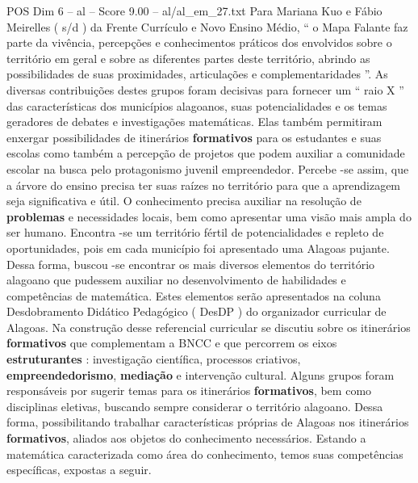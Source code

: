 \begin{textsample}{POS Dim 6 – al – Score 9.00 – al/al\_em\_27.txt}
Para Mariana Kuo e Fábio Meirelles ( s/d ) da Frente Currículo e Novo Ensino Médio, “ o Mapa Falante faz parte da vivência, percepções e conhecimentos práticos dos envolvidos sobre o território em geral e sobre as diferentes partes deste território, abrindo as possibilidades de suas proximidades, articulações e complementaridades ”.
As diversas contribuições destes grupos foram decisivas para fornecer um “ raio X ” das características dos municípios alagoanos, suas potencialidades e os temas geradores de debates e investigações matemáticas.
Elas também permitiram enxergar possibilidades de itinerários \textbf{formativos} para os estudantes e suas escolas como também a percepção de projetos que podem auxiliar a comunidade escolar na busca pelo protagonismo juvenil empreendedor.
Percebe -se assim, que a árvore do ensino precisa ter suas raízes no território para que a aprendizagem seja significativa e útil.
O conhecimento precisa auxiliar na resolução de \textbf{problemas} e necessidades locais, bem como apresentar uma visão mais ampla do ser humano.
Encontra -se um território fértil de potencialidades e repleto de oportunidades, pois em cada município foi apresentado uma Alagoas pujante.
Dessa forma, buscou -se encontrar os mais diversos elementos do território alagoano que pudessem auxiliar no desenvolvimento de habilidades e competências de matemática.
Estes elementos serão apresentados na coluna Desdobramento Didático Pedagógico ( DesDP ) do organizador curricular de Alagoas.
Na construção desse referencial curricular se discutiu sobre os itinerários \textbf{formativos} que complementam a BNCC e que percorrem os eixos \textbf{estruturantes} : investigação científica, processos criativos, \textbf{empreendedorismo}, \textbf{mediação} e intervenção cultural.
Alguns grupos foram responsáveis por sugerir temas para os itinerários \textbf{formativos}, bem como disciplinas eletivas, buscando sempre considerar o território alagoano.
Dessa forma, possibilitando trabalhar características próprias de Alagoas nos itinerários \textbf{formativos}, aliados aos objetos do conhecimento necessários.
Estando a matemática caracterizada como área do conhecimento, temos suas competências específicas, expostas a seguir.

\end{textsample}
